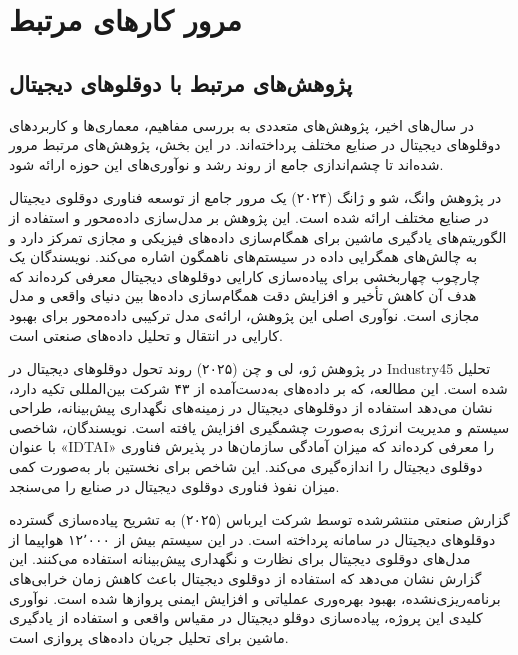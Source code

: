 
\section{مرور کارهای مرتبط}

\subsection{پژوهش‌های مرتبط با دوقلوهای دیجیتال}

در سال‌های اخیر، پژوهش‌های متعددی به بررسی مفاهیم، معماری‌ها و کاربردهای دوقلوهای دیجیتال  در صنایع مختلف پرداخته‌اند. در این بخش، پژوهش‌های مرتبط مرور شده‌اند تا چشم‌اندازی جامع از روند رشد و نوآوری‌های این حوزه ارائه شود.


در پژوهش 
وانگ، شو و ژانگ (۲۰۲۴)
  \cite{wang2024digitaltwin} یک مرور جامع از توسعه فناوری دوقلوی دیجیتال در صنایع مختلف ارائه شده است. این پژوهش بر مدل‌سازی داده‌محور و استفاده از الگوریتم‌های یادگیری ماشین برای همگام‌سازی داده‌های فیزیکی و مجازی تمرکز دارد و به چالش‌های همگرایی داده در سیستم‌های ناهمگون اشاره می‌کند. نویسندگان یک چارچوب چهاربخشی برای پیاده‌سازی کارایی دوقلوهای دیجیتال معرفی کرده‌اند که هدف آن کاهش تأخیر و افزایش دقت همگام‌سازی داده‌ها بین دنیای واقعی و مدل مجازی است. نوآوری اصلی این پژوهش، ارائه‌ی مدل ترکیبی داده‌محور برای بهبود کارایی در انتقال و تحلیل داده‌های صنعتی است.

در پژوهش
ژو، لی و چن (۲۰۲۵)
 \cite{zhou2025newera} روند تحول دوقلوهای دیجیتال در \gls{Industry45} تحلیل شده است. این مطالعه، که بر داده‌های به‌دست‌آمده از ۴۳ شرکت بین‌المللی تکیه دارد، نشان می‌دهد استفاده از دوقلوهای دیجیتال در زمینه‌های نگهداری پیش‌بینانه، طراحی سیستم و مدیریت انرژی به‌صورت چشمگیری افزایش یافته است. نویسندگان، شاخصی با عنوان «\gls{IDTAI}» را معرفی کرده‌اند که میزان آمادگی سازمان‌ها در پذیرش فناوری دوقلوی دیجیتال را اندازه‌گیری می‌کند. این شاخص برای نخستین بار به‌صورت کمی میزان نفوذ فناوری دوقلوی دیجیتال در صنایع را می‌سنجد.

 

گزارش صنعتی منتشرشده توسط شرکت
ایرباس (۲۰۲۵)
\cite{airbus2025digitaltwins} به تشریح پیاده‌سازی گسترده دوقلوهای دیجیتال در سامانه 
 \lr{ } \cite{airbus2024skywisecorex}
  پرداخته است. در این سیستم بیش از ۱۲٬۰۰۰ هواپیما از مدل‌های دوقلوی دیجیتال برای نظارت و نگهداری پیش‌بینانه استفاده می‌کنند. این گزارش نشان می‌دهد که استفاده از دوقلوی دیجیتال باعث کاهش زمان خرابی‌های برنامه‌ریزی‌نشده، بهبود بهره‌وری عملیاتی و افزایش ایمنی پروازها شده است. نوآوری کلیدی این پروژه، پیاده‌سازی دوقلو دیجیتال در مقیاس واقعی و استفاده از یادگیری ماشین برای تحلیل جریان داده‌های پروازی است.


